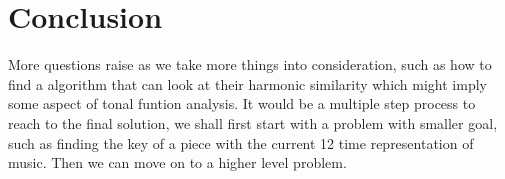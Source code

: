 \section*{Conclusion}
More questions raise as we take more things into consideration, such as how to find a 
algorithm that can look at their harmonic similarity which might imply some aspect of 
tonal funtion analysis. It would be a multiple step process to reach to the final solution,
we shall first start with a problem with smaller goal, such as finding the key of a piece
with the current 12 time representation of music. Then we can move on to a higher level 
problem.



